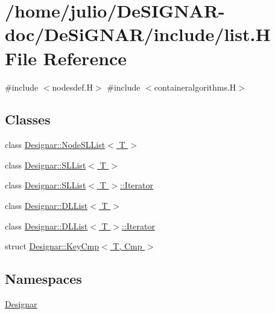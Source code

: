 \hypertarget{list_8_h}{}\section{/home/julio/\+De\+S\+I\+G\+N\+A\+R-\/doc/\+De\+Si\+G\+N\+A\+R/include/list.H File Reference}
\label{list_8_h}
{\ttfamily \#include $<$nodesdef.\+H$>$}\newline
{\ttfamily \#include $<$containeralgorithms.\+H$>$}\newline
\subsection*{Classes}
\begin{DoxyCompactItemize}
\item 
class \hyperlink{class_designar_1_1_node_s_l_list}{Designar\+::\+Node\+S\+L\+List$<$ T $>$}
\item 
class \hyperlink{class_designar_1_1_s_l_list}{Designar\+::\+S\+L\+List$<$ T $>$}
\item 
class \hyperlink{class_designar_1_1_s_l_list_1_1_iterator}{Designar\+::\+S\+L\+List$<$ T $>$\+::\+Iterator}
\item 
class \hyperlink{class_designar_1_1_d_l_list}{Designar\+::\+D\+L\+List$<$ T $>$}
\item 
class \hyperlink{class_designar_1_1_d_l_list_1_1_iterator}{Designar\+::\+D\+L\+List$<$ T $>$\+::\+Iterator}
\item 
struct \hyperlink{struct_designar_1_1_key_cmp}{Designar\+::\+Key\+Cmp$<$ T, Cmp $>$}
\end{DoxyCompactItemize}
\subsection*{Namespaces}
\begin{DoxyCompactItemize}
\item 
 \hyperlink{namespace_designar}{Designar}
\end{DoxyCompactItemize}

